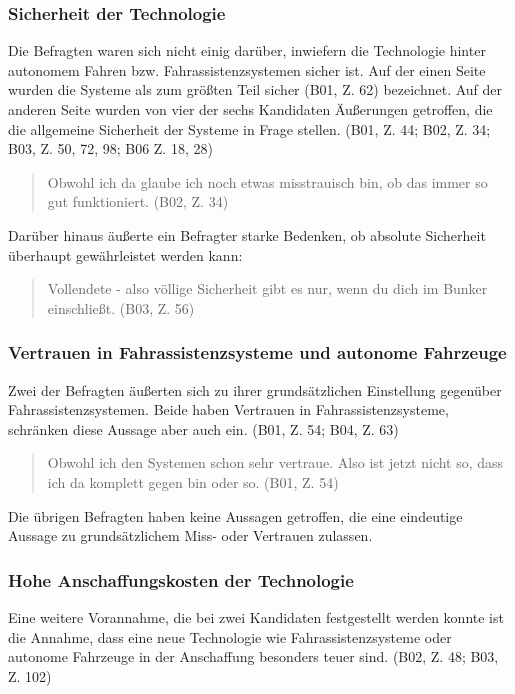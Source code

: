 \documentclass[12pt]{article}
\begin{document}
\subsubsection*{Sicherheit der Technologie}
Die Befragten waren sich nicht einig darüber, inwiefern die Technologie hinter autonomem Fahren bzw. Fahrassistenzsystemen sicher ist. Auf der einen Seite wurden die Systeme als \glqq zum größten Teil sicher\grqq{} (B01, Z. 62) bezeichnet. Auf der anderen Seite wurden von vier der sechs Kandidaten Äußerungen getroffen, die die allgemeine Sicherheit der Systeme in Frage stellen. (B01, Z. 44; B02, Z. 34; B03, Z. 50, 72, 98; B06 Z. 18, 28)

\begin{quote}
  Obwohl ich da glaube ich noch etwas misstrauisch bin, ob das immer so gut funktioniert. (B02, Z. 34)
\end{quote}

Darüber hinaus äußerte ein Befragter starke Bedenken, ob absolute Sicherheit überhaupt gewährleistet werden kann:

\begin{quote}
  Vollendete - also völlige Sicherheit gibt es nur, wenn du dich im Bunker einschließt. (B03, Z. 56)
\end{quote}

\subsubsection*{Vertrauen in Fahrassistenzsysteme und autonome Fahrzeuge}
Zwei der Befragten äußerten sich zu ihrer grundsätzlichen Einstellung gegenüber Fahrassistenzsystemen. Beide haben Vertrauen in Fahrassistenzsysteme, schränken diese Aussage aber auch ein. (B01, Z. 54; B04, Z. 63)

\begin{quote}
  Obwohl ich den Systemen schon sehr vertraue. Also ist jetzt nicht so, dass ich da komplett gegen bin oder so. (B01, Z. 54)
\end{quote}

Die übrigen Befragten haben keine Aussagen getroffen, die eine eindeutige Aussage zu grundsätzlichem Miss- oder Vertrauen zulassen.

\subsubsection*{Hohe Anschaffungskosten der Technologie}
Eine weitere Vorannahme, die bei zwei Kandidaten festgestellt werden konnte ist die Annahme, dass eine neue Technologie wie Fahrassistenzsysteme oder autonome Fahrzeuge in der Anschaffung besonders teuer sind. (B02, Z. 48; B03, Z. 102)
\end{document}
